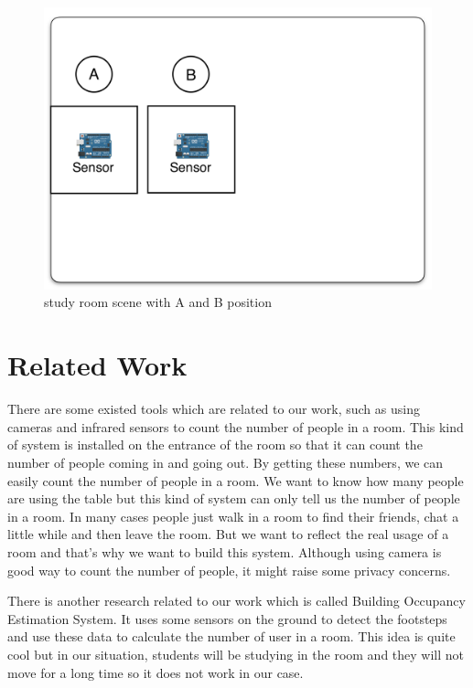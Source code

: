 \documentclass{sig-alternate-ipsn13}
\begin{document}

\begin{figure}
  \centering
  \includegraphics[width=1\linewidth]{figure/scene1.png}
  \caption{study room scene with A and B position}
  \label{fig:Scene}
\end{figure}

\section{Related Work}
There are some existed tools which are related to our work, such as using cameras and infrared sensors to count the number of people in a room\cite{cite4}. This kind of system is installed on the entrance of the room so that it can count the number of people coming in and going out. By getting these numbers, we can easily count the number of people in a room. We want to know how many people are using the table but this kind of system can only tell us the number of people in a room. In many cases people just walk in a room to find their friends, chat a little while and then leave the room. But we want to reflect the real usage of a room and that's why we want to build this system. Although using camera is good way to count the number of people, it might raise some privacy concerns.

There is another research related to our work which is called Building Occupancy Estimation System\cite{cite1}. It uses some sensors on the ground to detect the footsteps and use these data to calculate the number of user in a room. This idea is quite cool but in our situation, students will be studying in the room and they will not move for a long time so it does not work in our case.
\end{document}
